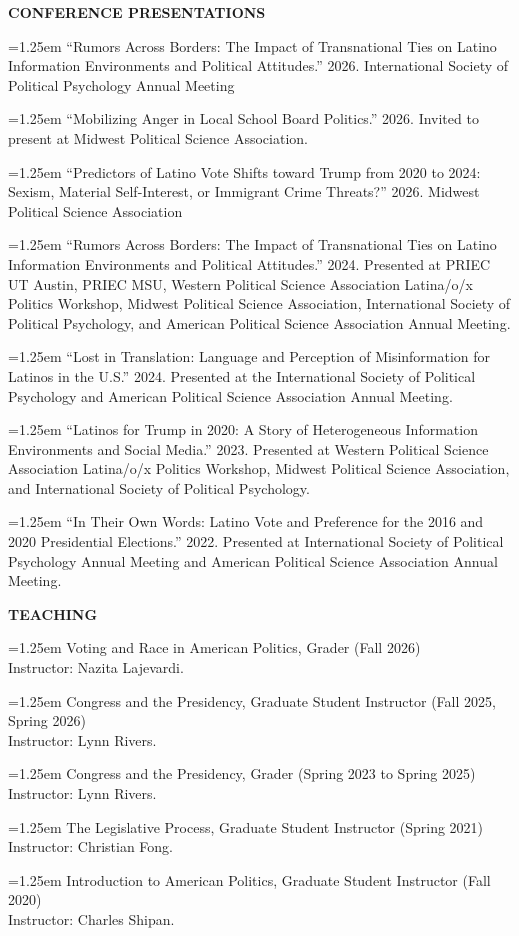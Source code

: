 \documentclass[11pt]{article}
\newlength{\leftcol}
\newlength{\rightcol}
\newcommand{\cvsection}[2]{%
\vspace{1.2em}
\noindent
\begin{minipage}[t]{\leftcol}
\raggedright \bfseries #1
\end{minipage}
\hspace{0.35in}
\begin{minipage}[t]{\rightcol}
#2
\end{minipage}
\par
}
\newcommand{\entry}[1]{%
\hangindent=1.25em
\hangafter=1
#1\par\vspace{0.35em}
}
\begin{document}
\cvsection{CONFERENCE PRESENTATIONS}{

\entry{``Rumors Across Borders: The Impact of Transnational Ties on Latino Information Environments and Political Attitudes.'' 2026. International Society of Political Psychology Annual Meeting}

\entry{``Mobilizing Anger in Local School Board Politics.'' 2026. Invited to present at Midwest Political Science Association.}

\entry{``Predictors of Latino Vote Shifts toward Trump from 2020 to 2024: Sexism, Material Self-Interest, or Immigrant Crime Threats?'' 2026. Midwest Political Science Association}

\entry{``Rumors Across Borders: The Impact of Transnational Ties on Latino Information Environments and Political Attitudes.'' 2024. Presented at PRIEC UT Austin, PRIEC MSU, Western Political Science Association Latina/o/x Politics Workshop, Midwest Political Science Association, International Society of Political Psychology, and American Political Science Association Annual Meeting.}

\entry{``Lost in Translation: Language and Perception of Misinformation for Latinos in the U.S.'' 2024. Presented at the International Society of Political Psychology and American Political Science Association Annual Meeting.}

\entry{``Latinos for Trump in 2020: A Story of Heterogeneous Information Environments and Social Media.'' 2023. Presented at Western Political Science Association Latina/o/x Politics Workshop, Midwest Political Science Association, and International Society of Political Psychology.}

\entry{``In Their Own Words: Latino Vote and Preference for the 2016 and 2020 Presidential Elections.'' 2022. Presented at International Society of Political Psychology Annual Meeting and American Political Science Association Annual Meeting.}
}

\cvsection{TEACHING}{

\entry{Voting and Race in American Politics, Grader (Fall 2026) \\ 
Instructor: Nazita Lajevardi.}

\entry{Congress and the Presidency, Graduate Student Instructor (Fall 2025, Spring 2026) \\
Instructor: Lynn Rivers.}

\entry{Congress and the Presidency, Grader (Spring 2023 to Spring 2025) \\ Instructor: Lynn Rivers.}

\entry{The Legislative Process, Graduate Student Instructor (Spring 2021)\\ Instructor: Christian Fong.}

\entry{Introduction to American Politics, Graduate Student Instructor (Fall 2020)\\ Instructor: Charles Shipan.}
}
\vspace{0.45em}
\end{document}
